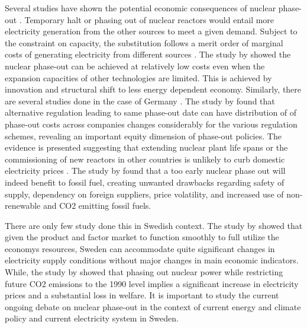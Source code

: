\documentclass[10pt,a4paper]{article}
\begin{document}
Several studies have shown the potential economic consequences of nuclear phase-out \citep{Bohringer2002, Nestle2012, Bretschger2012, Duscha0, Glomsrod2013, Kunsch2014}. Temporary halt or phasing out of nuclear reactors would entail more electricity generation from the other sources to meet a given demand. Subject to the constraint on capacity, the substitution follows a merit order of marginal costs of generating electricity from different sources \citep{Glomsrod2013}. The study by \cite{Bretschger2012} showed the nuclear phase-out can be achieved at relatively low costs even when the expansion capacities of other technologies are limited. This is achieved by innovation and structural shift to less energy dependent economy. Similarly, there are several studies done in the case of Germany \citep{Bohringer2002, Nestle2012}. The study by \cite{Bohringer2002} found that alternative regulation leading to same phase-out date can have distribution of of phase-out costs across companies changes considerably for the various regulation schemes, revealing an important equity dimension of phase-out policies. The evidence is presented suggesting that extending nuclear plant life spans or the commissioning of new reactors in other countries is unlikely to curb domestic electricity prices \citep{Nestle2012}. The study by \cite{Kunsch2014} found that a too early nuclear phase out will indeed benefit to fossil fuel, creating unwanted drawbacks regarding safety of supply, dependency on foreign suppliers, price volatility, and increased use of non-renewable and CO2 emitting fossil fuels.

There are only few study done this in Swedish context. The study by \citep{Bergman1981} showed that given the product and factor market to function smoothly to full utilize the economys resources, Sweden can accommodate quite significant changes in electricity supply conditions without major changes in main economic indicators. While, the study by \cite{ Andersson1997} showed that phasing out nuclear power while restricting future CO2 emissions to the 1990 level implies a significant increase in electricity prices and a substantial loss in welfare. It is important to study the current ongoing debate on nuclear phase-out in the context of current energy and climate policy and current electricity system in Sweden.
\end{document}
